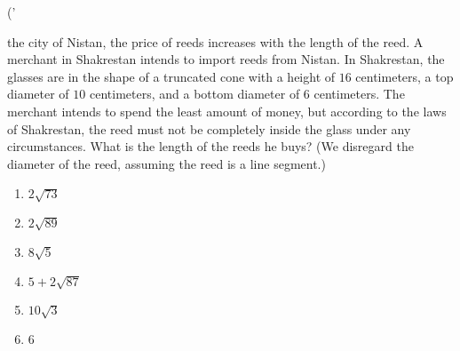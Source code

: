 ('\documentclass{article}\n\usepackage{amsmath}\n\begin{document}\n\nIn the city of Nistan, the price of reeds increases with the length of the reed. A merchant in Shakrestan intends to import reeds from Nistan. In Shakrestan, the glasses are in the shape of a truncated cone with a height of $16$ centimeters, a top diameter of $10$ centimeters, and a bottom diameter of $6$ centimeters. The merchant intends to spend the least amount of money, but according to the laws of Shakrestan, the reed must not be completely inside the glass under any circumstances. What is the length of the reeds he buys? (We disregard the diameter of the reed, assuming the reed is a line segment.)\n\n\begin{enumerate}\n    \item $2\sqrt{73}$\n    \item $2\sqrt{89}$\n    \item $8\sqrt{5}$\n    \item $5 + 2\sqrt{87}$\n    \item $10\sqrt{3}$\n    \item $6$\n\end{enumerate}\n\n\end{document}',)
\begin{document}
\n\nThe king of Shakrestan, who has a palace in the shape of a square, recently found an inscription in the salty script related to one of his ancestors who was a mathematician. Linguists determined that there are treasures located at various points in the city. Below is the translation of the inscription.\n\nThe treasures are hidden at points in the city such that if each of them is symmetrically reflected with respect to the northern side, southern side, eastern side, western side, the first diagonal, and finally the second diagonal of the palace, it returns to its original position.\n\nHow many treasures are hidden in the city?\n\n\[ 8 \quad (5 \quad 4 \quad (4 \quad 2 \quad (3 \quad 1 \quad (2 \quad 0 \quad (1 \]\n\n
\end{document}

